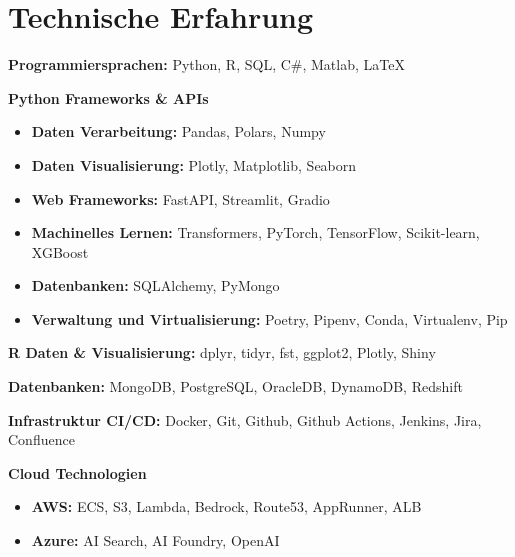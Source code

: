 \documentclass{maxcv}
\begin{document}
\CVHeader{}

\section{Technische Erfahrung}

\textbf{Programmiersprachen:} Python, R, SQL, C\#, Matlab, {\LaTeX}

\vspace{1 ex}

\begin{twocolentry}{}
    \textbf{Python Frameworks \& APIs}
\end{twocolentry}
\vspace{-1 em}
\begin{itemize}
    \setlength{\itemsep}{0pt}
    \item \textbf{Daten Verarbeitung:} Pandas, Polars, Numpy
    \item \textbf{Daten Visualisierung:} Plotly, Matplotlib, Seaborn
    \item \textbf{Web Frameworks:} FastAPI, Streamlit, Gradio
    \item \textbf{Machinelles Lernen:} Transformers, PyTorch, TensorFlow, Scikit-learn, XGBoost
    \item \textbf{Datenbanken:} SQLAlchemy, PyMongo
    \item \textbf{Verwaltung und Virtualisierung:} Poetry, Pipenv, Conda, Virtualenv, Pip
\end{itemize}\vspace{-\baselineskip}

\vspace{1 ex}

\textbf{R Daten \& Visualisierung:} dplyr, tidyr, fst, ggplot2, Plotly, Shiny

\vspace{1 ex}

\textbf{Datenbanken:} MongoDB, PostgreSQL, OracleDB, DynamoDB, Redshift

\vspace{1 ex}

\textbf{Infrastruktur CI/CD:} Docker, Git, Github, Github Actions, Jenkins, Jira, Confluence

\vspace{1 ex}

\begin{twocolentry}{}
    \textbf{Cloud Technologien}
\end{twocolentry}
\vspace{-1 em}
\begin{itemize}
    \setlength{\itemsep}{0pt}
    \item \textbf{AWS:} ECS, S3, Lambda, Bedrock, Route53, AppRunner, ALB
    \item \textbf{Azure:} AI Search, AI Foundry, OpenAI
\end{itemize}\vspace{-\baselineskip}
\end{document}
